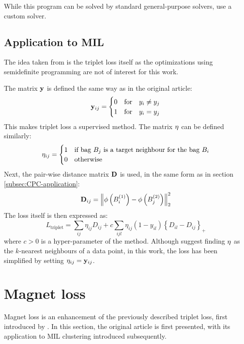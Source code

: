While this program can be solved by standard general-purpose solvers, \cite{weinberger_distance_2006} use a custom solver.

\subsection{Application to MIL}
The idea taken from \cite{weinberger_distance_2006} is the triplet loss itself as the optimizations using semidefinite programming are not of interest for this work.

The matrix \( \mathbf{y} \) is defined the same way as in the original article:
\[ \mathbf{y}_{ij} = \begin{cases}
    0 &\text{for} \quad y_i \neq y_j \\
    1 &\text{for} \quad y_i = y_j \\
  \end{cases} \]
This makes triplet loss a supervised method. The matrix \( \mathbf{\eta} \) can be defined similarly:
\[ \mathbf{\eta}_{ij} = \begin{cases}
    1 &\text{if bag } B_j \text{ is a target neighbour for the bag } B_i \\
    0 &\text{otherwise}
  \end{cases} \]
Next, the pair-wise distance matrix \( \mathbf{D} \) is used, in the same form as in section \ref{subsec:CPC-application}:
\[ \mathbf{D}_{ij} = \left\lVert \phi \left( B_i^{(1)} \right) - \phi \left( B_j^{(2)} \right) \right\rVert_2^2 \]
The loss itself is then expressed as:
\[ L_\mathrm{triplet} = \sum_{ij} \eta_{ij} D_{ij} + c \sum_{ijl} \eta_{ij} \left( 1 - y_{il} \right) \left\{ D_{il} - D_{ij} \right\}_+ \]
where \( c > 0 \) is a hyper-parameter of the method. Although \cite{weinberger_distance_2006} suggest finding \( \mathbf{\eta} \) as the \( k \)-nearest neighbours of a data point, in this work, the loss has been simplified by setting \( \mathbf{\eta}_{ij} = \mathbf{y}_{ij} \).

\section{Magnet loss}
Magnet loss is an enhancement of the previously described triplet loss, first introduced by \cite{rippel_metric_2015}. In this section, the original article is first presented, with its application to MIL clustering introduced subsequently.

